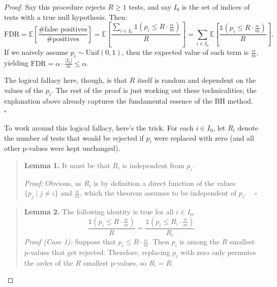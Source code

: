 \begin{proof}
    Say this procedure rejects $R \geq 1$ tests,
    and say $I_0$ is the set of indices of tests
    with a true null hypothesis.  Then:
    \[
    \text{FDR}
    = \mathbb{E}\left[
        \frac{\text{\# false positives}}{\text{\# positives}}
    \right]
    = \mathbb{E}\left[
        \frac{\sum_{i \in I_0} \mathds{1}\left(
            p_i \leq R \cdot \frac{\alpha}{m}
        \right)}{R}
    \right]
    = \sum_{i \in I_0} \mathbb{E}\left[
        \frac{\mathds{1}\left(
            p_i \leq R \cdot \frac{\alpha}{m}
        \right)}{R}
    \right].
    \]
    If we naively assume $p_i \sim \mathrm{Unif}(0, 1)$,
    then the expected value of each term is $\frac{\alpha}{m}$,
    yielding $\text{FDR} = \alpha \cdot \frac{|I_0|}{m} \leq \alpha$.

    The logical fallacy here, though, is that
    $R$ itself is random and dependent on the values of the $p_i$.
    The rest of the proof is just working out these technicalities;
    the explanation above already captures
    the fundamental essence of the BH method. ~ $\square$

    To work around this logical fallacy, here's the trick.
    For each $i \in I_0$,
    let $R_i$ denote the number of tests that would be rejected
    if $p_i$ were replaced with zero
    (and all other p-values were kept unchanged).

    \begin{quote}
        \textbf{Lemma 1.}
        It must be that $R_i$ is independent from $p_i$.

        \emph{Proof:}
        Obvious, as $R_i$ is by definition a direct function of the values
        $\{p_j \mid j \neq i\}$ and $\frac{\alpha}{m}$,
        which the theorem assumes to be independent of $p_i$. ~ $\square$
    \end{quote}

    \begin{quote}
        \textbf{Lemma 2.}
        The following identity is true for all $i \in I_0$.
        \[ \frac{\mathds{1}\left(
            {p_i \leq R \cdot \frac{\alpha}{m}}
        \right)}{R}
        = \frac{\mathds{1}\left(
            {p_i \leq R_i \cdot \frac{\alpha}{m}}
        \right)}{R_i}. \]
        \emph{Proof (Case 1):}
        Suppose that $p_i \leq R \cdot \frac{\alpha}{m}$.
        Then $p_i$ is among the $R$ smallest p-values that get rejected.
        Therefore, replacing $p_i$ with zero
        only permutes the order of the $R$ smallest p-values,
        so $R_i = R$.
        

\end{quote}
\end{proof}
